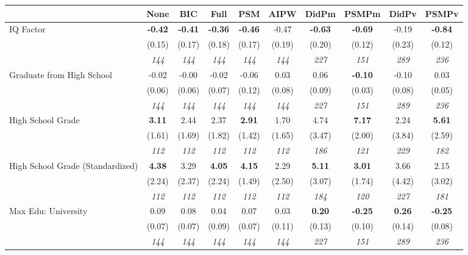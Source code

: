 \begin{tabular}{l c c c c c c c c c}
\toprule
 & None & BIC & Full & PSM & AIPW & DidPm & PSMPm & DidPv & PSMPv \\
\midrule
IQ Factor & \textbf{ -0.42 } & \textbf{ -0.41 } & \textbf{ -0.36 } & \textbf{-0.46} & -0.47 & \textbf{ -0.63 } & \textbf{-0.69} & -0.19 & \textbf{-0.84} \\
& (0.15) & (0.17) & (0.18) & (0.17) & (0.19) & (0.20) & (0.12) & (0.23) & (0.12) \\
& \textit{ 144 } & \textit{ 144 } & \textit{ 144 } & \textit{ 144 } & \textit{ 144 } & \textit{ 227 } & \textit{ 151 } & \textit{ 289 } & \textit{ 236 } \\
Graduate from High School & -0.02 & -0.00 & -0.02 & -0.06 & 0.03 & 0.06 & \textbf{-0.10} & -0.10 & 0.03 \\
& (0.06) & (0.06) & (0.07) & (0.12) & (0.08) & (0.09) & (0.03) & (0.08) & (0.05) \\
& \textit{ 144 } & \textit{ 144 } & \textit{ 144 } & \textit{ 144 } & \textit{ 144 } & \textit{ 227 } & \textit{ 151 } & \textit{ 289 } & \textit{ 236 } \\
High School Grade & \textbf{ 3.11 } & 2.44 & 2.37 & \textbf{2.91} & 1.70 & 4.74 & \textbf{7.17} & 2.24 & \textbf{5.61} \\
& (1.61) & (1.69) & (1.82) & (1.42) & (1.65) & (3.47) & (2.00) & (3.84) & (2.59) \\
& \textit{ 112 } & \textit{ 112 } & \textit{ 112 } & \textit{ 112 } & \textit{ 112 } & \textit{ 186 } & \textit{ 121 } & \textit{ 229 } & \textit{ 182 } \\
High School Grade (Standardized) & \textbf{ 4.38 } & 3.29 & \textbf{ 4.05 } & \textbf{4.15} & 2.29 & \textbf{ 5.11 } & \textbf{3.01} & 3.66 & 2.15 \\
& (2.24) & (2.37) & (2.24) & (1.49) & (2.50) & (3.07) & (1.74) & (4.42) & (3.02) \\
& \textit{ 112 } & \textit{ 112 } & \textit{ 112 } & \textit{ 112 } & \textit{ 112 } & \textit{ 184 } & \textit{ 120 } & \textit{ 227 } & \textit{ 181 } \\
Max Edu: University & 0.09 & 0.08 & 0.04 & 0.07 & 0.03 & \textbf{ 0.20 } & \textbf{-0.25} & \textbf{ 0.26 } & \textbf{-0.25} \\
& (0.07) & (0.07) & (0.09) & (0.07) & (0.11) & (0.13) & (0.10) & (0.14) & (0.08) \\
& \textit{ 144 } & \textit{ 144 } & \textit{ 144 } & \textit{ 144 } & \textit{ 144 } & \textit{ 227 } & \textit{ 151 } & \textit{ 289 } & \textit{ 236 } \\

\end{tabular}
